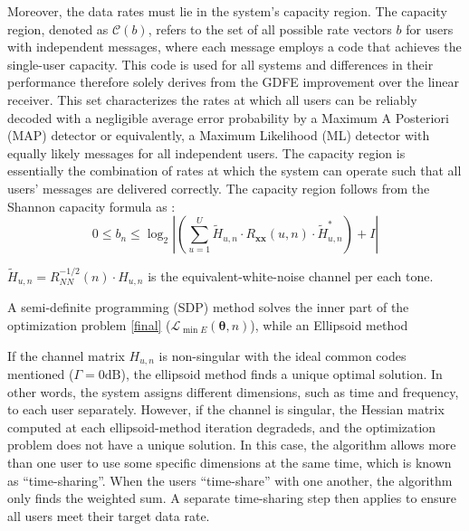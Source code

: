 Moreover, the data rates must lie in the system's capacity region. The capacity region, denoted as $\mathcal{C}(b)$, refers to the set of all possible rate vectors $b$ for users with independent messages, where each message employs a code that achieves the single-user capacity. This code is used for all systems and differences in their performance therefore solely derives from the GDFE improvement over the linear receiver.  This set characterizes the rates at which all users can be reliably decoded with a negligible average error probability by a Maximum A Posteriori (MAP) detector or equivalently, a Maximum Likelihood (ML) detector with equally likely messages for all independent users. The capacity region is essentially the combination of rates at which the system can operate such that all users' messages are delivered correctly. %
The capacity region follows from the Shannon capacity formula as \cite{shannon}: 
\begin{equation}
0 \leq b_n %
\leq \log _2\left|\left(\sum_{u=1}^U \widetilde{H}_{u, n} \cdot R_{\boldsymbol{x} \boldsymbol{x}}(u, n) \cdot \widetilde{H}_{u, n}^*\right)+I\right|
\end{equation}

$\tilde{H}_{u, n}=R_{N N}^{-1 / 2}(n) \cdot H_{u, n}$ is the equivalent-white-noise channel per each tone.

A semi-definite programming (SDP) method solves the inner part of the optimization problem \ref{final} ($\mathcal{L}_{\min E}(\boldsymbol{\theta}, n)$), while an Ellipsoid method \cite{yudin1976constrained} 

If the channel matrix $H_{u,n}$ is non-singular with the ideal common codes mentioned ($\Gamma = 0 \textrm{dB}$), the ellipsoid method finds a unique optimal solution. In other words, the system assigns different dimensions, such as time and frequency, to each user separately. However, if the channel is singular, the Hessian matrix computed at each ellipsoid-method iteration degradeds, and the optimization problem does not have a unique solution. In this case, the algorithm allows more than one user to use some specific dimensions at the same time, which is known as “time-sharing”. When the users “time-share” with one another, the algorithm only finds the weighted sum.  A separate time-sharing step then applies to ensure all users meet their target data rate.  

